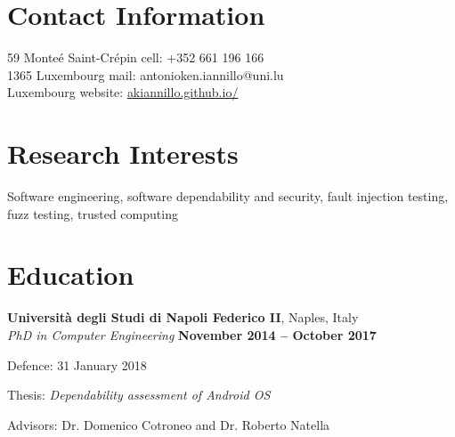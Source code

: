 \documentclass[margin,line]{resume}
\newif\ifReferences
\newif\ifOnline
\begin{document}
\Referencesfalse
\Onlinefalse


\begin{resume}


\section{\mysidestyle Contact Information}
\ifOnline
	mail: ak.iannillo@gmail.com	 							\hfill Luxembourg\\
\else
    59 Monte\'e Saint-Cr\'epin			                   			\hfill cell: +352 661 196 166\\
    1365 Luxembourg								        \hfill mail: antonioken.iannillo@uni.lu\\
    Luxembourg										\hfill website: \url{akiannillo.github.io/}\\
\fi




\section{\mysidestyle Research Interests}
Software engineering, software dependability and security, fault injection testing, fuzz testing, trusted computing


\section{\mysidestyle Education}
\textbf{Universit\`a degli Studi di Napoli Federico II}, Naples, Italy \vspace{1mm}\\%
\textsl{PhD in Computer Engineering} \hfill \textbf{November 2014 -- October 2017}\vspace{-3mm}\\\vspace{-1mm}%
\begin{list2}
	\item Defence: 31 January 2018
	\item Thesis: \textsl{Dependability assessment of Android OS}
	\item Advisors: Dr. Domenico Cotroneo and Dr. Roberto Natella
\end{list2}


\end{resume}
\end{document}
